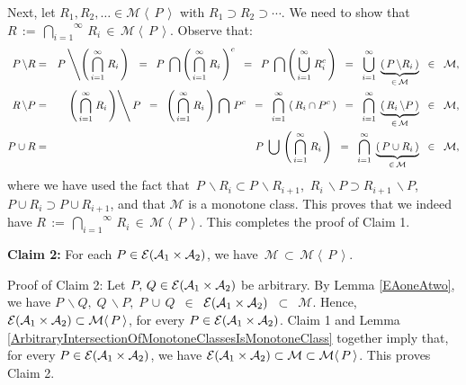 \vskip0.1cm
\noindent
Next, let $R_{1}, R_{2}, \ldots \in \mathcal{M}\!\left\langle\,P\,\right\rangle$
with $R_{1} \supset R_{2} \supset \cdots$.
We need to show that $R \,:=\, \overset{\infty}{\underset{i=1}{\bigcap}}\,R_{i} \,\in\, \mathcal{M}\!\left\langle\,P\,\right\rangle$.
Observe that:
\begin{eqnarray*}
P\,\backslash R
&=&
	P\left\backslash\left(\,\overset{\infty}{\underset{i=1}{\bigcap}}\;R_{i}\,\right)\right.
	\;\;=\;\;
	P\;\bigcap\left(\,\overset{\infty}{\underset{i=1}{\bigcap}}\;R_{i}\,\right)^{c}
	\;\;=\;\;
	P\;\bigcap\left(\,\overset{\infty}{\underset{i=1}{\bigcup}}\;R_{i}^{c}\,\right)
	\;\;=\;\;
	\overset{\infty}{\underset{i=1}{\bigcup}}\,\;\underset{\in\,\mathcal{M}}{\underbrace{\left(\,P\,\backslash R_{i}\,\right)}}
	\;\; \in \;\; \mathcal{M},
\\
R\,\backslash P
&=&
	\left. \left(\,\overset{\infty}{\underset{i=1}{\bigcap}}\;R_{i}\,\right) \right\backslash P
	\;\;=\;\;
	\left(\,\overset{\infty}{\underset{i=1}{\bigcap}}\;R_{i}\,\right) \,\bigcap\, P^{c}
	\;\;=\;\;
	\overset{\infty}{\underset{i=1}{\bigcap}}\,\left(\,R_{i} \cap P^{c}\,\right)
	\;\;=\;\;
	\overset{\infty}{\underset{i=1}{\bigcap}}\,\;\underset{\in\,\mathcal{M}}{\underbrace{\left(\,R_{i}\,\backslash P\,\right)}}
	\;\; \in \;\; \mathcal{M},
\\
P\cup R
&=&
	P\;\bigcup\,\left(\,\overset{\infty}{\underset{i=1}{\bigcap}}\;R_{i}\,\right)
	\;\;=\;\;
	\overset{\infty}{\underset{i=1}{\bigcap}}\,\;\underset{\in\,\mathcal{M}}{\underbrace{\left(\,P \cup R_{i}\,\right)}}
	\;\; \in \;\; \mathcal{M},
\end{eqnarray*}
where we have used the fact that
\,$P\,\backslash R_{i} \subset P\,\backslash R_{i+1}$,
\,$R_{i}\,\backslash P \supset R_{i+1}\,\backslash P$,
\,$P \cup R_{i} \supset P \cup R_{i+1}$, and
that $\mathcal{M}$ is a monotone class.
This proves that we indeed have
$R \,:=\, \overset{\infty}{\underset{i=1}{\bigcap}}\,R_{i} \,\in\, \mathcal{M}\!\left\langle\,P\,\right\rangle$.
This completes the proof of Claim 1.

\vskip 0.5cm
\begin{center}
\begin{minipage}{6.5in}
\textbf{Claim 2:}\quad
For each $P \in \mathcal{E}\!\left(\mathcal{A}_{1}\times\mathcal{A}_{2}\right)$, we have
\,$\mathcal{M} \,\subset\, \mathcal{M}\!\left\langle\,P\,\right\rangle$.
\end{minipage}
\end{center}
Proof of Claim 2:\quad
Let $P,\,Q \in \mathcal{E}\!\left(\mathcal{A}_{1}\times\mathcal{A}_{2}\right)$ be arbitrary.
By Lemma \ref{EAoneAtwo}, we have
$P\,\backslash Q,\; Q\,\backslash P,\; P\,\cup\,Q$ \,$\in$\,
$\mathcal{E}\!\left(\mathcal{A}_{1}\times\mathcal{A}_{2}\right)$ \,$\subset$\, $\mathcal{M}$.
Hence, $\mathcal{E}\!\left(\mathcal{A}_{1}\times\mathcal{A}_{2}\right) \subset \mathcal{M}\!\left\langle\,P\,\right\rangle$,
for every $P \in \mathcal{E}\!\left(\mathcal{A}_{1}\times\mathcal{A}_{2}\right)$.
Claim 1 and Lemma \ref{ArbitraryIntersectionOfMonotoneClassesIsMonotoneClass} together imply that,
for every $P \in \mathcal{E}\!\left(\mathcal{A}_{1}\times\mathcal{A}_{2}\right)$, we have
$\mathcal{E}\!\left(\mathcal{A}_{1}\times\mathcal{A}_{2}\right) \subset \mathcal{M} \subset \mathcal{M}\!\left\langle\,P\,\right\rangle$.
This proves Claim 2.

